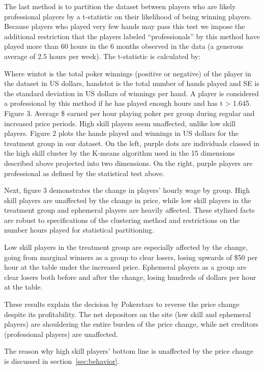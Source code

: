 \documentclass[12pt]{article}
\begin{document}
The last method is to partition the dataset between players who are likely professional players by a t-statistic on their likelihood of being winning players. Because players who played very few hands may pass this test we impose the additional restriction that the players labeled “professionals” by this method have played more than 60 hours in the 6 months observed in the data (a generous average of 2.5 hours per week). The t-statistic is calculated by:

Where wintot is the total poker winnings (positive or negative) of the player in the dataset in US dollars, handstot is the total number of hands played and SE is the standard deviation in US dollars of winnings per hand. A player is considered a professional by this method if he has played enough hours and has t > 1.645.  
Figure 3. Average \$ earned per hour playing poker per group during regular and increased price periods. High skill players seem unaffected, unlike low skill players.
Figure 2 plots the hands played and winnings in US dollars for the treatment group in our dataset. On the left, purple dots are individuals classed in the high skill cluster by the K-means algorithm used in the 15 dimensions described above projected into two dimensions. On the right, purple players are professional as defined by the statistical test above.			

Next, figure 3 demonstrates the change in players’ hourly wage by group. High skill players are unaffected by the change in price, while low skill players in the treatment group and ephemeral players are heavily affected. These stylized facts are robust to specifications of the clustering method and restrictions on the number hours played for statistical partitioning.

Low skill players in the treatment group are especially affected by the change, going from marginal winners as a group to clear losers, losing upwards of \$50 per hour at the table under the increased price. Ephemeral players as a group are clear losers both before and after the change, losing hundreds of dollars per hour at the table.

These results explain the decision by Pokerstars to reverse the price change despite its profitability. The net depositors on the site (low skill and ephemeral players) are shouldering the entire burden of the price change, while net creditors (professional players) are unaffected. 

The reason why high skill players’ bottom line is unaffected by the price change is discussed in section~\ref{sec:behavior}.
\end{document}
